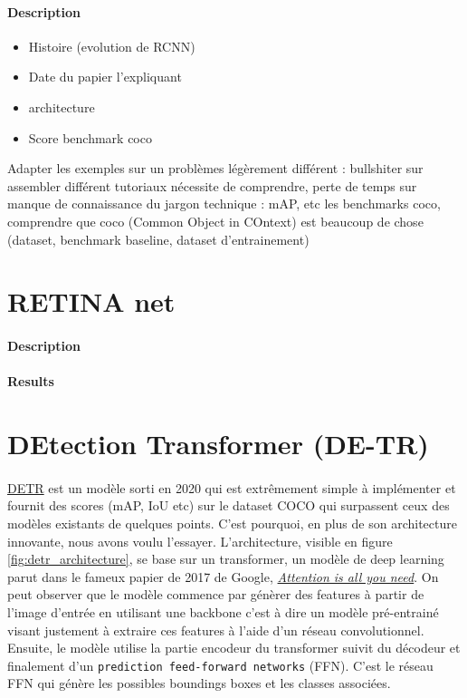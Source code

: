 \paragraph{Description}





\begin{itemize}
    \item Histoire (evolution de RCNN) 
    \item Date du papier l’expliquant 
    \item architecture
    \item Score benchmark coco
\end{itemize}
Adapter les exemples sur un problèmes légèrement différent : bullshiter sur assembler différent tutoriaux nécessite de comprendre, perte de temps sur manque de connaissance du jargon technique : mAP, etc les benchmarks coco, comprendre que coco (Common Object in COntext) est beaucoup de chose (dataset, benchmark baseline, dataset d’entrainement)





\section{RETINA net}
\paragraph{Description}

\paragraph{Results}








\section{DEtection Transformer (DE-TR)}
\paragraph{} 
\href{https://github.com/facebookresearch/detr}{DETR} est un modèle sorti en 2020 qui est extrêmement simple à implémenter et fournit des scores (mAP, IoU etc) sur le dataset COCO qui surpassent ceux des modèles existants de quelques points. C’est pourquoi, en plus de son architecture innovante, nous avons voulu l’essayer. L’architecture, visible en figure \ref{fig:detr_architecture}, se base sur un transformer, un modèle de deep learning parut dans le fameux papier de 2017 de Google, \href{https://arxiv.org/pdf/1706.03762.pdf}{\textit{Attention is all you need}}. On peut observer que le modèle commence par génèrer des features à partir de l'image d'entrée en utilisant une backbone c'est à dire un modèle pré-entrainé visant justement à extraire ces features à l'aide d'un réseau convolutionnel. Ensuite, le modèle utilise la partie encodeur du transformer suivit du décodeur et finalement d'un \verb|prediction feed-forward networks| (FFN). C'est le réseau FFN qui génère les possibles boundings boxes et les classes associées.

